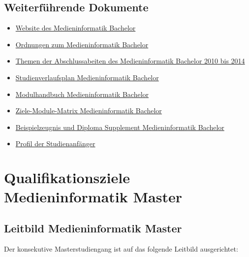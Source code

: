 \subsection{Weiterführende
Dokumente}\label{weiterfuxfchrende-dokumente}

\begin{itemize}
\tightlist
\item
  \href{https://www.th-koeln.de/studium/medieninformatik-bachelor_2379.php}{Website
  des Medieninformatik Bachelor}
\item
  \href{https://www.th-koeln.de/studium/medieninformatik-bachelor--ordnungen-und-formulare_3963.php}{Ordnungen
  zum Medieninformatik Bachelor}
\item
  \href{https://th-koeln.github.io/mi-2017/anhaenge/ba-abschlussarbeiten_2010-2014_.pdf}{Themen der
  Abschlussabeiten des Medieninformatik Bachelor 2010 bis 2014}
\item
  \href{https://th-koeln.github.io/mi-2017/anhaenge/ba-studienverlaufsplan.pdf}{Studienverlaufsplan
  Medieninformatik Bachelor}
\item
  \href{https://th-koeln.github.io/mi-2017/download/modulbeschreibungen-bachelor.pdf}{Modulhandbuch
  Medieninformatik Bachelor}
\item
  \href{https://th-koeln.github.io/mi-2017/anhaenge/ba-Ziele-Module-Matrix-Medieninformatik-Bachelor.pdf}{Ziele-Module-Matrix
  Medieninformatik Bachelor}
\item
  \href{https://th-koeln.github.io/mi-2017/anhaenge/ba-zeugnis.pdf}{Beispielzeugnis und Diploma
  Supplement Medieninformatik Bachelor}
\item
  \href{https://th-koeln.github.io/mi-2017/anhaenge/stat-profil-studienanfaenger-2017.pdf}{Profil der
  Studienanfänger}
\end{itemize}

\section{Qualifikationsziele Medieninformatik
Master}\label{qualifikationsziele-medieninformatik-master}

\subsection{Leitbild Medieninformatik
Master}\label{leitbild-medieninformatik-master}

Der konsekutive Masterstudiengang ist auf das folgende Leitbild
ausgerichtet:

